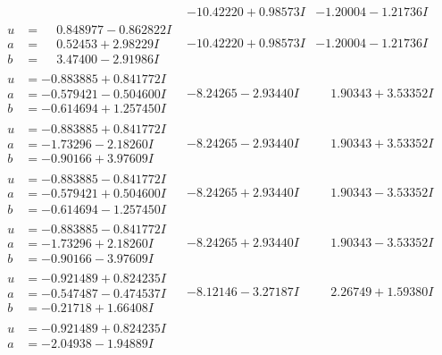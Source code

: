\documentclass[1p]{elsarticle_modified}
\theoremstyle{definition}
\begin{document}
$$\begin{array}{c|c|c}
 & -10.42220 + 0.98573 I & -1.20004 - 1.21736 I \\ \hline\begin{aligned}
u &= \phantom{-}0.848977 - 0.862822 I \\
a &= \phantom{-}0.52453 + 2.98229 I \\
b &= \phantom{-}3.47400 - 2.91986 I\end{aligned}
 & -10.42220 + 0.98573 I & -1.20004 - 1.21736 I \\ \hline\begin{aligned}
u &= -0.883885 + 0.841772 I \\
a &= -0.579421 - 0.504600 I \\
b &= -0.614694 + 1.257450 I\end{aligned}
 & -8.24265 - 2.93440 I & \phantom{-}1.90343 + 3.53352 I \\ \hline\begin{aligned}
u &= -0.883885 + 0.841772 I \\
a &= -1.73296 - 2.18260 I \\
b &= -0.90166 + 3.97609 I\end{aligned}
 & -8.24265 - 2.93440 I & \phantom{-}1.90343 + 3.53352 I \\ \hline\begin{aligned}
u &= -0.883885 - 0.841772 I \\
a &= -0.579421 + 0.504600 I \\
b &= -0.614694 - 1.257450 I\end{aligned}
 & -8.24265 + 2.93440 I & \phantom{-}1.90343 - 3.53352 I \\ \hline\begin{aligned}
u &= -0.883885 - 0.841772 I \\
a &= -1.73296 + 2.18260 I \\
b &= -0.90166 - 3.97609 I\end{aligned}
 & -8.24265 + 2.93440 I & \phantom{-}1.90343 - 3.53352 I \\ \hline\begin{aligned}
u &= -0.921489 + 0.824235 I \\
a &= -0.547487 - 0.474537 I \\
b &= -0.21718 + 1.66408 I\end{aligned}
 & -8.12146 - 3.27187 I & \phantom{-}2.26749 + 1.59380 I \\ \hline\begin{aligned}
u &= -0.921489 + 0.824235 I \\
a &= -2.04938 - 1.94889 I \\

\end{aligned}
\end{array}$$
\end{document}
